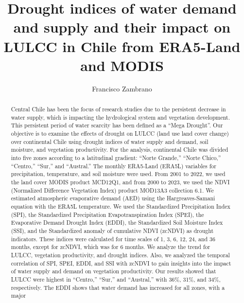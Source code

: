 \documentclass[
  number,
  preprint,
  3p,
  onecolumn]{elsarticle}
\begin{document}
\begin{frontmatter}
\title{Drought indices of water demand and supply and their impact on
LULCC in Chile from ERA5-Land and MODIS}
\author[1]{Francisco Zambrano%
%
}


        
\begin{abstract}
Central Chile has been the focus of research studies due to the
persistent decrease in water supply, which is impacting the hydrological
system and vegetation development. This persistent period of water
scarcity has been defined as a ``Mega Drought''. Our objective is to
examine the effects of drought on LULCC (land use land cover change)
over continental Chile using drought indices of water supply and demand,
soil moisture, and vegetation productivity. For the analysis,
continental Chile was divided into five zones according to a latitudinal
gradient: ``Norte Grande,'' ``Norte Chico,'' ``Centro,'' ``Sur,'' and
``Austral.'' The monthly ERA5-Land (ERA5L) variables for precipitation,
temperature, and soil moisture were used. From 2001 to 2022, we used the
land cover MODIS product MCD12Q1, and from 2000 to 2023, we used the
NDVI (Normalized Difference Vegetation Index) product MOD13A3 collection
6.1. We estimated atmospheric evaporative demand (AED) using the
Hargreaves-Samani equation with the ERA5L temperature. We used the
Standardized Precipitation Index (SPI), the Standardized Precipitation
Evapotranspiration Index (SPEI), the Evaporative Demand Drought Index
(EDDI), the Standardized Soil Moisture Index (SSI), and the Standardized
anomaly of cumulative NDVI (zcNDVI) as drought indicators. These indices
were calculated for time scales of 1, 3, 6, 12, 24, and 36 months,
except for zcNDVI, which was for 6 months. We analyze the trend for
LULCC, vegetation productivity, and drought indices. Also, we analyzed
the temporal correlation of SPI, SPEI, EDDI, and SSI with zcNDVI to gain
insights into the impact of water supply and demand on vegetation
productivity. Our results showed that LULCC were highest in ``Centro,''
``Sur,'' and ``Austral,'' with 36\%, 31\%, and 34\%, respectively. The
EDDI shows that water demand has increased for all zones, with a major

\end{abstract}
\end{frontmatter}
\end{document}

